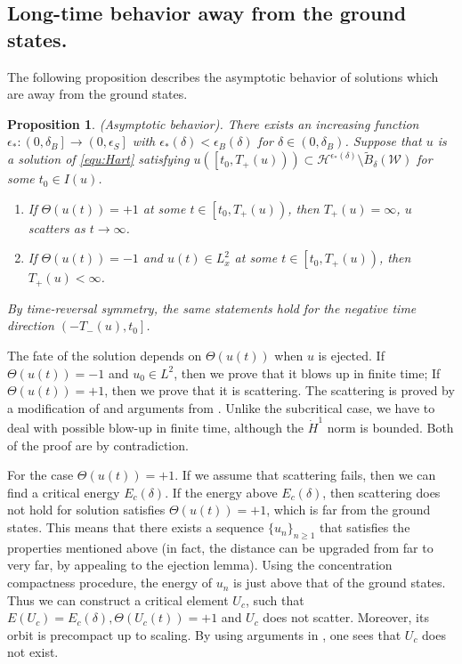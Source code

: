 \documentclass[reqno, 11pt]{amsart}
\numberwithin{equation}{section}
\theoremstyle{plain}
\newtheorem{proposition}[theorem]{Proposition}
\theoremstyle{definition}
\numberwithin{equation}{section}
\numberwithin{theorem}{section}
\numberwithin{equation}{section}
\numberwithin{equation}{section}
\numberwithin{theorem}{section}
\begin{document}
	
	
	\subsection{Long-time behavior away from the ground states.} The following proposition describes the asymptotic behavior of solutions which are away from the ground states.
	
	\begin{proposition}(Asymptotic behavior)\label{prop:asyp behar}. There exists an increasing function $\epsilon_{*}:\left(0,\delta_{B}\right]\rightarrow \left(0,\epsilon_{S}\right]$ with $\epsilon_{*}(\delta)< \epsilon_{B}(\delta)$ for $\delta\in (0,\delta_B)$. Suppose that $u$ is a solution of \eqref{equ:Hart} satisfying $u\left( \left[ t_0,T_{+}(u) \right) \right)\subset \mathcal{H}^{\epsilon_{*}(\delta)}\setminus \widetilde{B}_{\delta}(\mathcal{W})$ for some $t_0\in I(u)$. 
		\begin{enumerate}
			\item[$(1)$] If $\Theta(u(t))=+1$ at some $t\in \left[ t_0,T_{+}(u) \right)$, then $T_{+}(u)=\infty$, $u$ scatters as $t\rightarrow\infty$.  
			\item[$(2)$]If $\Theta(u(t))=-1$ and $u(t)\in L_{x}^{2}$ at some $t\in \left[ t_0,T_{+}(u) \right)$, then $T_{+}(u)<\infty$. 
		\end{enumerate}
		By time-reversal symmetry, the same statements hold for the negative time direction $\left(-T_{-}(u),t_0\right]$.
	\end{proposition} 
	
	The fate of the solution depends on $\Theta(u(t))$ when $u$ is ejected. If $\Theta(u(t))=-1$ and $u_0 \in L^2$, then we prove that it blows up in finite time; If $\Theta(u(t))=+1$, then we prove that it is scattering. The scattering is proved by a modification of \cite{MXZ:crit Hart:f rad} and arguments from \cite{NakS:NLS}. Unlike the subcritical case, we have to deal with possible blow-up in finite time, although the $\dot{H}^1$ norm is bounded. Both of the proof are by contradiction. 
	
	For the case $\Theta(u(t))=+1$. If we assume that scattering fails, then we can find a critical energy $E_c(\delta)$. If the energy above $E_c(\delta)$, then scattering does not hold for solution satisfies $\Theta(u(t))=+1$, which is far from the ground states. This means that there exists a sequence $\{u_n\}_{n\geq1}$ that satisfies the properties mentioned above (in fact, the distance can be upgraded from far to very far, by appealing to the ejection lemma). Using the concentration compactness procedure, the energy of $u_n$ is just above that of the ground states. Thus we can construct a critical element $U_c$, such that $E(U_c)=E_c(\delta), \Theta(U_c(t))=+1$ and $U_c$ does not scatter. Moreover, its orbit is precompact up to scaling. By using arguments in \cite{MXZ:crit Hart:f rad}, one sees that $U_c$ does not exist.
	
\end{document}
